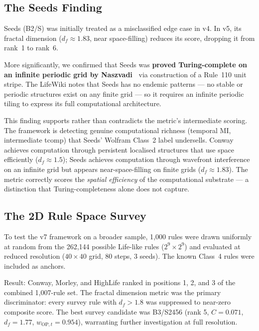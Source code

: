 \documentclass[12pt,a4paper]{article}
\begin{document}
\subsection{The Seeds Finding}
\label{sec:seeds}

Seeds (B2/S) was initially treated as a misclassified edge case
in v4.
In v5, its fractal dimension ($d_f\approx1.83$, near space-filling)
reduces its score, dropping it from rank~1 to rank~6.

More significantly, we confirmed that Seeds was \textbf{proved
Turing-complete on an infinite periodic grid by
Naszvadi~\cite{naszvadi2020}} via construction of a Rule~110 unit
stripe.
The LifeWiki notes that Seeds has no endemic patterns --- no stable or
periodic structures exist on any finite grid --- so it requires an
infinite periodic tiling to express its full computational
architecture.

This finding supports rather than contradicts the metric's
intermediate scoring.
The framework is detecting genuine computational richness (temporal MI,
intermediate tcomp) that Seeds' Wolfram Class~2 label undersells.
Conway achieves computation through persistent localised structures
that use space efficiently ($d_f\approx1.5$); Seeds achieves
computation through wavefront interference on an infinite grid but
appears near-space-filling on finite grids ($d_f\approx1.83$).
The metric correctly scores the \emph{spatial efficiency} of the
computational substrate --- a distinction that Turing-completeness
alone does not capture.

\subsection{The 2D Rule Space Survey}

To test the v7 framework on a broader sample, 1,000 rules were drawn
uniformly at random from the 262,144 possible Life-like rules
($2^9\times2^9$) and evaluated at reduced resolution
($40\times40$ grid, 80 steps, 3 seeds).
The known Class~4 rules were included as anchors.

Result: Conway, Morley, and HighLife ranked in positions 1, 2, and 3
of the combined 1,007-rule set.
The fractal dimension metric was the primary discriminator: every
survey rule with $d_f>1.8$ was suppressed to near-zero composite
score.
The best survey candidate was B3/S2456 (rank 5, $C=0.071$,
$d_f=1.77$, $w_{\text{OP},t}=0.954$), warranting further
investigation at full resolution.

\end{document}
